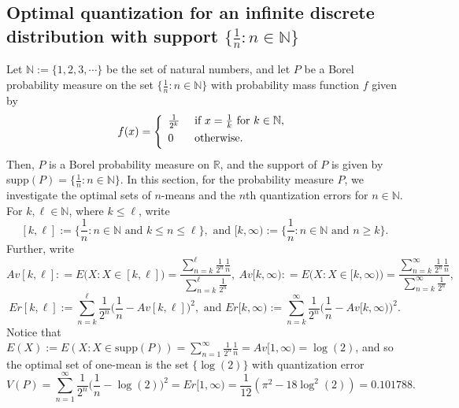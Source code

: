 \documentclass[12pt, reqno]{amsart}
\theoremstyle{plain}
\theoremstyle{definition}
\newcommand{\set}[1]{\{#1\}}%
\newcommand{\D}[1]{\mathbb{#1}}%
\newcommand{\te}{\text}%
\begin{document}
\subsection{Optimal quantization for an infinite discrete distribution with support $\set{\frac 1 n : n\in \D N}$} \label{sec3}

Let $\D N:=\set{1, 2, 3, \cdots}$ be the set of natural numbers, and let $P$ be a Borel probability measure on the set $\set{\frac 1 n : n \in \D N}$ with probability mass function $f$ given by
\[f(x)=\left\{\begin{array} {ll} \vspace{0.05 in}
\frac 1{2^k} & \te{ if } x =\frac 1 k \te { for } k\in \D N,\\ \vspace{0.05 in}
0 &  \te{ otherwise}.
\end{array}
\right.\]
Then, $P$ is a Borel probability measure on $\D R$, and the support of $P$ is given by supp$(P)=\set{\frac 1 n :  n \in \D N}$.  In this section, for the probability measure $P$, we investigate the optimal sets of $n$-means and the $n$th quantization errors for $n\in \D N$. For $k, \ell\in \D N$, where $k\leq \ell$, write
\[[k, \ell]:=\set{\frac 1 n : n \in \D N \te{ and } k\leq n\leq \ell}, \te{ and } [k, \infty):=\set{\frac 1 n : n\in \D N \te{ and } n\geq k}.\]
Further, write
\[Av[k, \ell]: =E\Big (X : X \in [k, \ell]\Big)=\frac{\sum _{n=k}^{\ell} \frac{1}{2^n} \frac 1 n}{\sum_{n=k}^{\ell}\frac{1}{2^n}}, \  Av[k, \infty): =E\Big (X : X \in [k, \infty)\Big)=\frac{\sum _{n=k}^{\infty} \frac{1}{2^n} \frac 1 n}{\sum_{n=k}^{\infty}\frac{1}{2^n}},\]
\[Er[k, \ell]:=\sum _{n=k}^{\ell} \frac{1}{2^n} \Big(\frac 1 n-Av[k, \ell]\Big)^2, \te{ and } Er[k, \infty):=\sum _{n=k}^{\infty} \frac{1}{2^n} \Big(\frac 1 n-Av[k,\infty)\Big)^2.\]
 Notice that
$E(X):=E(X : X \in \te{supp}(P)) =\sum _{n=1}^\infty \frac 1{2^n} \frac 1 n=Av[1, \infty)=\log(2)$, and so the optimal set of one-mean is the set $\set{\log(2)}$ with quantization error
\[V(P)=\sum _{n=1}^{\infty} \frac 1 {2^n} \Big (\frac{1}{n}-\log(2)\Big)^2=Er[1, \infty) =\frac{1}{12} \left(\pi ^2-18 \log ^2(2)\right)=0.101788.\]
\end{document}
